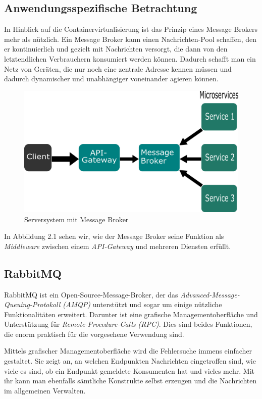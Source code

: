 \documentclass[12pt,a4paper]{scrartcl}
\begin{document}
\subsection{Anwendungsspezifische Betrachtung}
In Hinblick auf die Containervirtualisierung ist das Prinzip eines Message Brokers mehr als nützlich.
Ein Message Broker kann einen Nachrichten-Pool schaffen, den er kontinuierlich und gezielt mit Nachrichten versorgt, die dann von den letztendlichen Verbrauchern konsumiert werden können. Dadurch schafft man ein Netz von Geräten, die nur noch eine zentrale Adresse kennen müssen und dadurch dynamischer und unabhängiger voneinander agieren können. 

\begin{figure}[h!]
	\centering
	\includegraphics[scale=1.8]{MesBroSys.png}
	\caption[Serversystem mit Message Broker]{Serversystem mit Message Broker}
\end{figure}

In Abbildung 2.1 sehen wir, wie der Message Broker seine Funktion als \emph{Middleware} zwischen einem \emph{API-Gateway} und mehreren Diensten erfüllt.  

\subsection{RabbitMQ}
RabbitMQ\cite{rabbit} ist ein Open-Source-Message-Broker, der das \emph{Advanced-Message-Queuing-Protokoll (AMQP)} unterstützt\cite{rabCon} und sogar um einige nützliche Funktionalitäten erweitert\cite{rabExt}.
Darunter ist eine grafische Managementoberfläche und Unterstützung für \emph{Remote-Procedure-Calls (RPC)}. Dies sind beides Funktionen, die enorm praktisch für die vorgesehene Verwendung sind.

Mittels grafischer Managementoberfläche wird die Fehlersuche immens einfacher gestaltet. Sie zeigt an, an welchen Endpunkten Nachrichten eingetroffen sind, wie viele es sind, ob ein Endpunkt gemeldete Konsumenten hat und vieles mehr. Mit ihr kann man ebenfalls sämtliche Konstrukte selbst erzeugen und die Nachrichten im allgemeinen Verwalten. 
\end{document}
